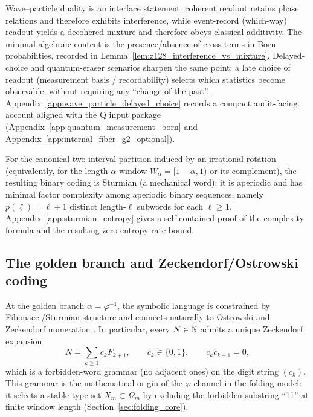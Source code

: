 \begin{remark}\label{rem:wave_particle_delayed_choice_pointer}
Wave--particle duality is an interface statement: coherent readout retains phase relations and therefore exhibits interference, while event-record (which-way) readout yields a decohered mixture and therefore obeys classical additivity.
The minimal algebraic content is the presence/absence of cross terms in Born probabilities, recorded in Lemma~\ref{lem:z128_interference_vs_mixture}.
Delayed-choice and quantum-eraser scenarios sharpen the same point: a late choice of readout (measurement basis / recordability) selects which statistics become observable, without requiring any ``change of the past''.
Appendix~\ref{app:wave_particle_delayed_choice} records a compact audit-facing account aligned with the Q input package (Appendix~\ref{app:quantum_measurement_born} and Appendix~\ref{app:internal_fiber_g2_optional}).
\end{remark}

\begin{remark}\label{rem:sturmian_minimal_complexity}
For the canonical two-interval partition induced by an irrational rotation
(equivalently, for the length-$\alpha$ window $W_\alpha=[1-\alpha,1)$ or its complement),
the resulting binary coding is Sturmian (a mechanical word): it is aperiodic and has
minimal factor complexity among aperiodic binary sequences, namely
$p(\ell)=\ell+1$ distinct length-$\ell$ subwords for each $\ell\ge 1$.
Appendix~\ref{app:sturmian_entropy} gives a self-contained proof of the complexity formula
and the resulting zero entropy-rate bound.
\end{remark}

\subsection{The golden branch and Zeckendorf/Ostrowski coding}
\label{subsec:zeckendorf_coding}

At the golden branch $\alpha=\varphi^{-1}$, the symbolic language is constrained by Fibonacci/Sturmian structure and connects naturally to Ostrowski and Zeckendorf numeration \cite{Zeckendorf1972,AlloucheShallit2003,Lothaire2002}.
In particular, every $N\in\mathbb{N}$ admits a unique Zeckendorf expansion
\begin{equation}\label{eq:zeckendorf}
N=\sum_{k\ge 1} c_k F_{k+1},
\qquad c_k\in\{0,1\},\qquad c_kc_{k+1}=0,
\end{equation}
which is a forbidden-word grammar (no adjacent ones) on the digit string $(c_k)$.
This grammar is the mathematical origin of the $\varphi$-channel in the folding model: it selects a stable type set $X_m\subset\Omega_m$ by excluding the forbidden substring ``11'' at finite window length (Section~\ref{sec:folding_core}).

